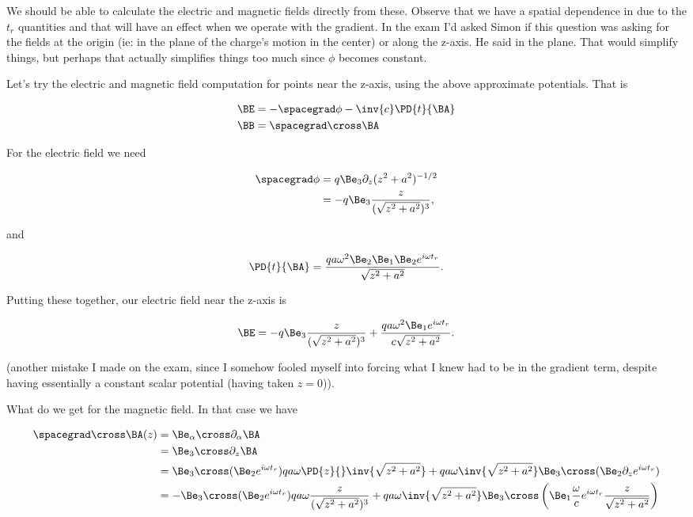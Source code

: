 We should be able to calculate the electric and magnetic fields directly from these.  Observe that we have a spatial dependence in due to the $t_r$ quantities and that will have an effect when we operate with the gradient.  In the exam I'd asked Simon if this question was asking for the fields at the origin (ie: in the plane of the charge's motion in the center) or along the z-axis.  He said in the plane.  That would simplify things, but perhaps that actually simplifies things too much since $\phi$ becomes constant.

Let's try the electric and magnetic field computation for points near the z-axis, using the above approximate potentials.  That is

\begin{align}\label{eqn:relativisticElectrodynamicsExamReflection:n}
\BE &= - \spacegrad \phi - \inv{c} \PD{t}{\BA} \\
\BB &= \spacegrad \cross \BA
\end{align}

For the electric field we need

\begin{align*}
\spacegrad \phi 
&= q \Be_3 \partial_z (z^2 + a^2)^{-1/2} \\
&= -q \Be_3 \frac{z}{(\sqrt{z^2 + a^2})^3},
\end{align*}

and

\begin{equation}\label{eqn:relativisticElectrodynamicsExamReflection:n}
\PD{t}{\BA} =
\frac{q a \omega^2 \Be_2 \Be_1 \Be_2 e^{i \omega t_r} }{\sqrt{z^2 + a^2}}.
\end{equation}

Putting these together, our electric field near the z-axis is

\begin{equation}\label{eqn:relativisticElectrodynamicsExamReflection:n}
\BE = 
-q \Be_3 \frac{z}{(\sqrt{z^2 + a^2})^3}
+
\frac{q a \omega^2 \Be_1 e^{i \omega t_r} }{c \sqrt{z^2 + a^2}}.
\end{equation}

(another mistake I made on the exam, since I somehow fooled myself into forcing what I knew had to be in the gradient term, despite having essentially a constant scalar potential (having taken $z = 0$)).

What do we get for the magnetic field.  In that case we have

\begin{align*}
\spacegrad \cross \BA(z)
&=
\Be_\alpha \cross \partial_\alpha \BA \\
&=
\Be_3 \cross \partial_z \BA \\
&=
\Be_3 \cross (\Be_2 e^{i \omega t_r} ) q a \omega \PD{z}{} \inv{\sqrt{z^2 + a^2}} 
+
q a \omega \inv{\sqrt{z^2 + a^2}} \Be_3 \cross (\Be_2 \partial_z e^{i \omega t_r} ) \\
&=
-\Be_3 \cross (\Be_2 e^{i \omega t_r} ) q a \omega \frac{z}{(\sqrt{z^2 + a^2})^3} 
+
q a \omega \inv{\sqrt{z^2 + a^2}} \Be_3 \cross \left( \Be_1 \frac{\omega}{c} e^{i \omega t_r} \frac{z}{\sqrt{z^2 + a^2} } \right)
\end{align*}

